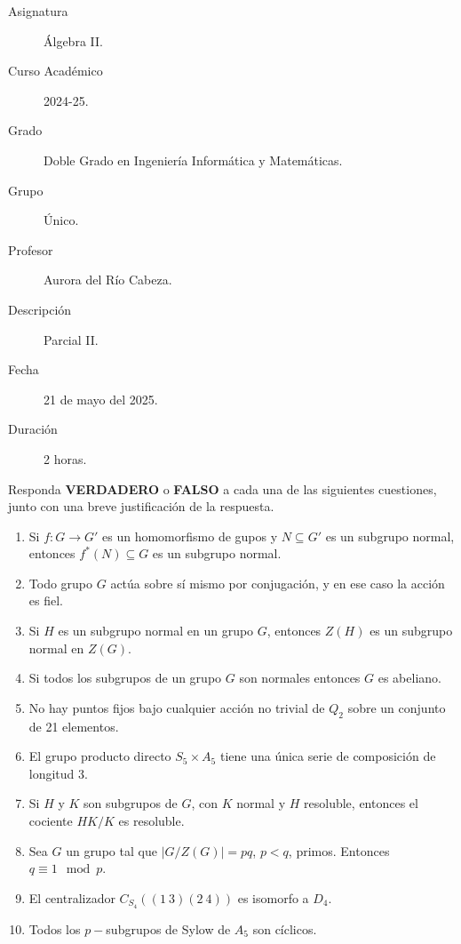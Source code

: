\documentclass[12pt]{article}
\begin{document}

    
    

    \begin{description}
        \item[Asignatura] Álgebra II.
        \item[Curso Académico] 2024-25.
        \item[Grado] Doble Grado en Ingeniería Informática y Matemáticas.
        \item[Grupo] Único.
        \item[Profesor] Aurora del Río Cabeza.
        \item[Descripción] Parcial II.
        \item[Fecha] 21 de mayo del 2025.
        \item[Duración] 2 horas.
    
    \end{description}
    \newpage

    \begin{ejercicio}[5 puntos]
        Responda \textbf{VERDADERO} o \textbf{FALSO} a cada una de las siguientes cuestiones, junto con una breve justificación de la respuesta.
        \begin{enumerate}
            \item Si $f:G\to G'$ es un homomorfismo de gupos y $N\subseteq G'$ es un subgrupo normal, entonces $f^\ast(N)\subseteq G$ es un subgrupo normal.
            \item Todo grupo $G$ actúa sobre sí mismo por conjugación, y en ese caso la acción es fiel.
            \item Si $H$ es un subgrupo normal en un grupo $G$, entonces $Z(H)$ es un subgrupo normal en $Z(G)$.
            \item Si todos los subgrupos de un grupo $G$ son normales entonces $G$ es abeliano.
            \item No hay puntos fijos bajo cualquier acción no trivial de $Q_2$ sobre un conjunto de 21 elementos.
            \item El grupo producto directo $S_5\times A_5$ tiene una única serie de composición de longitud 3.
            \item Si $H$ y $K$ son subgrupos de $G$, con $K$ normal y $H$ resoluble, entonces el cociente $HK/K$ es resoluble.
            \item Sea $G$ un grupo tal que $|G/Z(G)| = pq$, $p<q$, primos. Entonces $q\equiv 1 \mod p$.
            \item El centralizador $C_{S_4}((1\ 3)(2\ 4))$ es isomorfo a $D_4$.
            \item Todos los $p-$subgrupos de Sylow de $A_5$ son cíclicos.
        \end{enumerate}
    \end{ejercicio}
\end{document}

